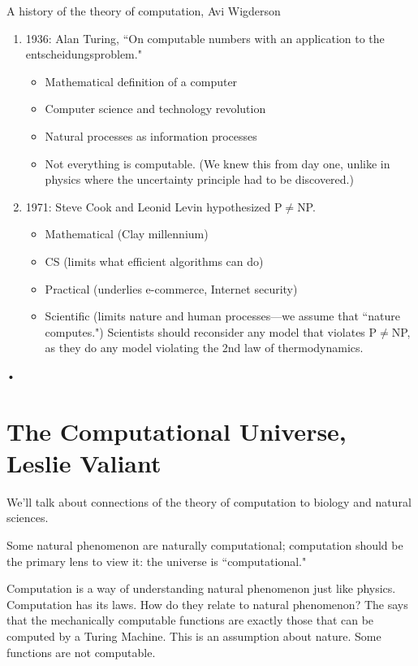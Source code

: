 A history of the theory of computation, Avi Wigderson
\begin{enumerate}
\item 1936: Alan Turing, ``On computable numbers with an application to the entscheidungsproblem." 
\begin{itemize}
\item
Mathematical definition of a computer
\item
Computer science and technology revolution
\item
Natural processes as information processes
\item
Not everything is computable. (We knew this from day one, unlike in physics where the uncertainty principle had to be discovered.)
\end{itemize}
\item 1971: Steve Cook and Leonid Levin hypothesized P$\ne$NP. 
\begin{itemize}
\item
Mathematical (Clay millennium)
\item
CS (limits what efficient algorithms can do)
\item
Practical (underlies e-commerce, Internet security)
\item
Scientific (limits nature and human processes---we assume that ``nature computes.")
Scientists should reconsider any model that violates P$\ne$NP, as they do any model violating the 2nd law of thermodynamics.
\end{itemize}
\end{enumerate}•

\section{The Computational Universe, Leslie Valiant}


We'll talk about connections of the theory of computation to biology and natural sciences.

Some natural phenomenon are naturally computational; computation should be the primary lens to view it: the universe is ``computational."

Computation is a way of understanding natural phenomenon just like physics. Computation has its laws. How do they relate to natural phenomenon? The  says that the mechanically computable functions are exactly those that can be computed by a Turing Machine. This is an assumption about nature. Some functions are not computable. 

